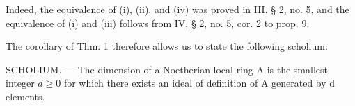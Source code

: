 Indeed, the equivalence of (i), (ii), and (iv) was proved in III, § 2, no. 5, and the equivalence of (i) and (iii) follows from IV, § 2, no. 5, cor. 2 to prop. 9.

The corollary of Thm. 1 therefore allows us to state the following scholium:

SCHOLIUM. --- The dimension of a Noetherian local ring A is the smallest integer \(d \geqslant 0\) for which there exists an ideal of definition of A generated by d elements.

